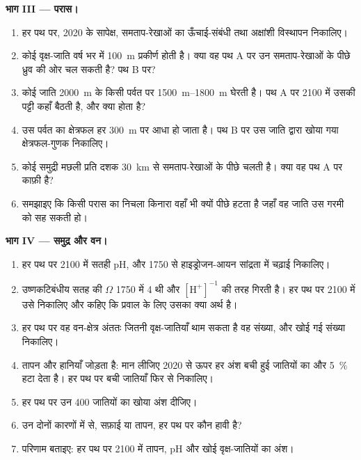 \begin{problem}
\medskip
\noindent\textbf{भाग III --- परास।}
\begin{enumerate}[resume]
  \item हर पथ पर, 2020 के सापेक्ष, समताप-रेखाओं का
        ऊँचाई-संबंधी तथा अक्षांशी विस्थापन निकालिए।
  \item कोई वृक्ष-जाति वर्ष भर में \qty{100}{m} प्रकीर्ण होती है। क्या वह पथ A पर
        उन समताप-रेखाओं के पीछे ध्रुव की ओर चल सकती है? पथ B पर?
  \item कोई जाति \qty{2000}{m} के किसी पर्वत पर \qtyrange{1500}{1800}{m}
        घेरती है। पथ A पर 2100 में उसकी पट्टी कहाँ बैठती है,
        और क्या होता है?
  \item उस पर्वत का क्षेत्रफल हर \qty{300}{m} पर आधा हो जाता है। पथ B पर उस
        जाति द्वारा खोया गया क्षेत्रफल-गुणक निकालिए।
  \item कोई समुद्री मछली प्रति दशक \qty{30}{km} से समताप-रेखाओं के पीछे चलती है।
        क्या वह पथ A पर काफ़ी है?
  \item समझाइए कि किसी परास का निचला किनारा वहाँ भी क्यों पीछे हटता है जहाँ
        वह जाति उस गरमी को सह सकती हो।
\end{enumerate}

\medskip
\noindent\textbf{भाग IV --- समुद्र और वन।}
\begin{enumerate}[resume]
  \item हर पथ पर 2100 में सतही pH, और 1750 से हाइड्रोजन-आयन
        सांद्रता में चढ़ाई निकालिए।
  \item उष्णकटिबंधीय सतह की  $\Omega$ 1750 में
        4 थी और $[\ensuremath{\mathrm{H^{+}}}]^{-1}$ की तरह गिरती है। हर पथ पर 2100 में उसे
        निकालिए और कहिए कि प्रवाल के लिए उसका क्या अर्थ है।
  \item हर पथ पर वह वन-क्षेत्र अंततः जितनी वृक्ष-जातियाँ थाम सकता है
        वह संख्या, और खोई गई संख्या निकालिए।
  \item तापन और हानियाँ जोड़ता है: मान लीजिए 2020 से ऊपर हर अंश
        बची हुई जातियों का और \qty{5}{\%} हटा देता है। हर पथ पर
        बची जातियाँ फिर से निकालिए।
  \item हर पथ पर उन 400 जातियों का खोया अंश दीजिए।
  \item उन दोनों कारणों में से, सफ़ाई या तापन, हर पथ पर कौन हावी है?
  \item परिणाम बताइए: हर पथ पर 2100 में तापन, pH और खोई
        वृक्ष-जातियों का अंश।
\end{enumerate}
\end{problem}
